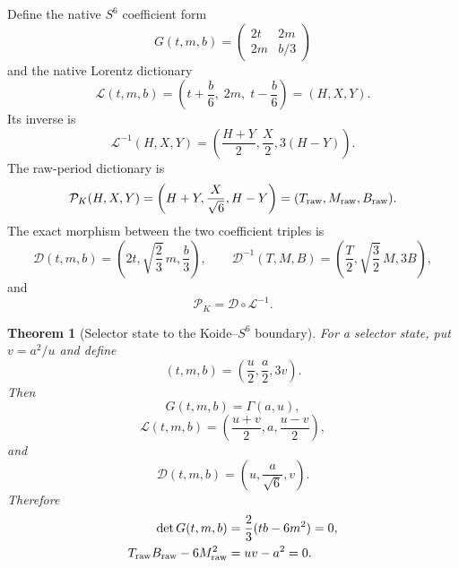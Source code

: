 \documentclass[11pt]{article}
\newtheorem{theorem}{Theorem}[section]
\theoremstyle{definition}
\theoremstyle{remark}
\begin{document}
Define the native $S^6$ coefficient form
\begin{equation}\label{eq:Gnative}
 G(t,m,b)=\begin{pmatrix}2t&2m\\2m&b/3\end{pmatrix}
\end{equation}
and the native Lorentz dictionary
\begin{equation}\label{eq:Lnative}
 \mathcal L(t,m,b)
 =\left(t+\frac b6,\;2m,\;t-\frac b6\right)=(H,X,Y).
\end{equation}
Its inverse is
\begin{equation}\label{eq:Linv}
 \mathcal L^{-1}(H,X,Y)
 =\left(\frac{H+Y}{2},\frac X2,3(H-Y)\right).
\end{equation}
The raw-period dictionary is
\begin{equation}\label{eq:PK}
 \mathcal P_K(H,X,Y)
 =\left(H+Y,\frac{X}{\sqrt6},H-Y\right)
 =(T_{\rm raw},M_{\rm raw},B_{\rm raw}).
\end{equation}
The exact morphism between the two coefficient triples is
\begin{equation}\label{eq:Dmap}
 \mathcal D(t,m,b)
 =\left(2t,\sqrt{\frac23}\,m,\frac b3\right),
 \qquad
 \mathcal D^{-1}(T,M,B)
 =\left(\frac T2,\sqrt{\frac32}\,M,3B\right),
\end{equation}
and
\begin{equation}\label{eq:dictionary-commutes}
 \mathcal P_K=\mathcal D\circ\mathcal L^{-1}.
\end{equation}

\begin{theorem}[Selector state to the Koide--$S^6$ boundary]
\label{thm:koide-boundary}
For a selector state, put $v=a^2/u$ and define
\begin{equation}\label{eq:S6-coeff-state}
 (t,m,b)=\left(\frac u2,\frac a2,3v\right).
\end{equation}
Then
\begin{equation}\label{eq:G=Gamma}
 G(t,m,b)=\Gamma(a,u),
\end{equation}
\begin{equation}\label{eq:native-Lorentz-state}
 \mathcal L(t,m,b)
 =\left(\frac{u+v}{2},a,\frac{u-v}{2}\right),
\end{equation}
and
\begin{equation}\label{eq:raw-state}
 \mathcal D(t,m,b)=\left(u,\frac a{\sqrt6},v\right).
\end{equation}
Therefore
\begin{align}
 \det G(t,m,b)
 &=\frac23(tb-6m^2)=0,\label{eq:native-zero}\\
 T_{\rm raw}B_{\rm raw}-6M_{\rm raw}^2
 &=uv-a^2=0.\label{eq:raw-zero}
\end{align}
\end{theorem}
\end{document}
